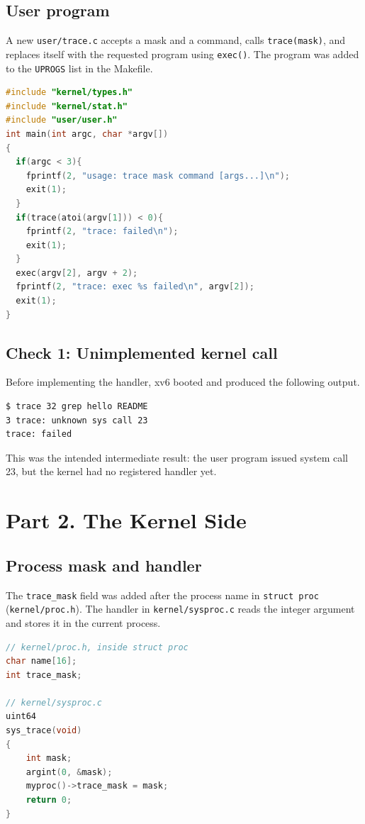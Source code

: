\documentclass[12pt,a4paper]{article}
\begin{document}
\subsection{User program}
A new \texttt{user/trace.c} accepts a mask and a command, calls \texttt{trace(mask)}, and replaces itself with the requested program using \texttt{exec()}. The program was added to the \texttt{UPROGS} list in the Makefile.
\begin{lstlisting}[language=C]
#include "kernel/types.h"
#include "kernel/stat.h"
#include "user/user.h"
int main(int argc, char *argv[])
{
  if(argc < 3){
    fprintf(2, "usage: trace mask command [args...]\n");
    exit(1);
  }
  if(trace(atoi(argv[1])) < 0){
    fprintf(2, "trace: failed\n");
    exit(1);
  }
  exec(argv[2], argv + 2);
  fprintf(2, "trace: exec %s failed\n", argv[2]);
  exit(1);
}
\end{lstlisting}
\subsection{Check 1: Unimplemented kernel call}
Before implementing the handler, xv6 booted and produced the following output.
\begin{lstlisting}
$ trace 32 grep hello README
3 trace: unknown sys call 23
trace: failed
\end{lstlisting}
This was the intended intermediate result: the user program issued system call 23, but the kernel had no registered handler yet.

\section{Part 2. The Kernel Side}
\subsection{Process mask and handler}
The \texttt{trace\_mask} field was added after the process name in \texttt{struct proc} (\texttt{kernel/proc.h}). The handler in \texttt{kernel/sysproc.c} reads the integer argument and stores it in the current process.
\begin{lstlisting}[language=C]
// kernel/proc.h, inside struct proc
char name[16];
int trace_mask;

// kernel/sysproc.c
uint64
sys_trace(void)
{
    int mask;
    argint(0, &mask);
    myproc()->trace_mask = mask;
    return 0;
}
\end{lstlisting}
\end{document}
